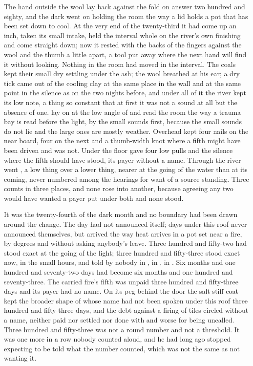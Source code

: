 
The hand outside the wool lay back against the fold on answer two hundred and eighty, and the dark went on holding the room the way a lid holds a pot that has been set down to cool. At the very end of the twenty-third it had come up an inch, taken its small intake, held the interval whole on the river's own finishing and come straight down; now it rested with the backs of the fingers against the wool and the thumb a little apart, a tool put away where the next hand will find it without looking. Nothing in the room had moved in the interval. The coals kept their small dry settling under the ash; the wool breathed at his ear; a dry tick came out of the cooling clay at the same place in the wall and at the same point in the silence as on the two nights before, and under all of it the river kept its low note, a thing so constant that at first it was not a sound at all but the absence of one.  lay on  at the low angle of  and read the room the way a trauma bay is read before the light, by the small sounds first, because the small sounds do not lie and the large ones are mostly weather. Overhead  kept four nails on the near board, four on the next and a thumb-width knot where a fifth might have been driven and was not. Under the floor  gave four low pulls and the silence where the fifth should have stood, its payer without a name. Through  the river went , a low thing over a lower thing, nearer at the going of the water than at its coming, never numbered among the hearings for want of a source standing. Three counts in three places, and none rose into another, because agreeing any two would have wanted a payer put under both and none stood.

It was the twenty-fourth of the dark month and no boundary had been drawn around the change. The day had not announced itself; days under this roof never announced themselves, but arrived the way heat arrives in a pot set near a fire, by degrees and without asking anybody's leave. Three hundred and fifty-two had stood exact at the going of the light; three hundred and fifty-three stood exact now, in the small hours, and told by nobody in , in , in . Six months and one hundred and seventy-two days had become six months and one hundred and seventy-three. The carried fire's fifth was unpaid three hundred and fifty-three days and its payer had no name. On its peg behind the door the salt-stiff coat kept the broader shape of  whose name had not been spoken under this roof three hundred and fifty-three days, and the debt against a firing of tiles circled without a name, neither paid nor settled nor done with and worse for being uncalled. Three hundred and fifty-three was not a round number and not a threshold. It was one more in a row nobody counted aloud, and he had long ago stopped expecting to be told what the number counted, which was not the same as not wanting it.


